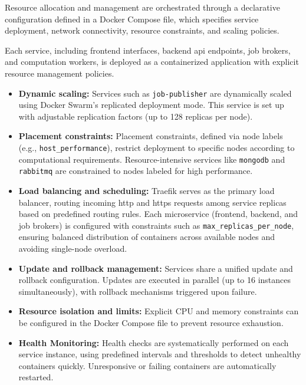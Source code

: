 {Resource allocation and management are orchestrated through a declarative configuration defined in a Docker Compose file, which specifies service deployment, network connectivity, resource constraints, and scaling policies.

Each service, including frontend interfaces, backend \acrshort{api} endpoints, job brokers, and computation workers, is deployed as a containerized application with explicit resource management policies.

\begin{itemize}
    \item \textbf{Dynamic scaling:} Services such as \texttt{job-publisher} are dynamically scaled using Docker Swarm's replicated deployment mode. This service is set up with adjustable replication factors (up to 128 replicas per node).
    
    \item \textbf{Placement constraints:} Placement constraints, defined via node labels (e.g., \texttt{host\_performance}), restrict deployment to specific nodes according to computational requirements. Resource-intensive services like \texttt{mongodb} and \texttt{rabbitmq} are constrained to nodes labeled for high performance.
    
    \item \textbf{Load balancing and scheduling:} Traefik serves as the primary load balancer, routing incoming \acrshort{http} and \acrshort{https} requests among service replicas based on predefined routing rules. Each microservice (frontend, backend, and job brokers) is configured with constraints such as \texttt{max\_replicas\_per\_node}, ensuring balanced distribution of containers across available nodes and avoiding single-node overload.
    
    \item \textbf{Update and rollback management:} Services share a unified update and rollback configuration. Updates are executed in parallel (up to 16 instances simultaneously), with rollback mechanisms triggered upon failure.
    
    \item \textbf{Resource isolation and limits:} Explicit CPU and memory constraints can be configured in the Docker Compose file to prevent resource exhaustion.
    
    \item \textbf{Health Monitoring:} Health checks are systematically performed on each service instance, using predefined intervals and thresholds to detect unhealthy containers quickly. Unresponsive or failing containers are automatically restarted.
\end{itemize}

}
